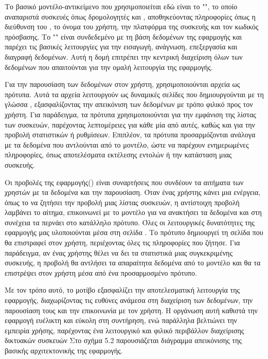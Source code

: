 Το βασικό μοντέλο-αντικείμενο που χρησιμοποιείται εδώ είναι το "", 
το οποίο αναπαριστά συσκευές όπως δρομολογητές και , 
αποθηκεύοντας πληροφορίες όπως η διεύθυνση του , το όνομα του
χρήστη, την πλατφόρμα της συσκευής και τον κωδικός πρόσβασης.
Το "" είναι συνδεδεμένο με 
τη βάση δεδομένων της εφαρμογής και παρέχει τις βασικές λειτουργίες 
για την εισαγωγή, ανάγνωση, επεξεργασία και διαγραφή δεδομένων. 
Αυτή η δομή επιτρέπει την κεντρική διαχείριση όλων των δεδομένων που 
απαιτούνται για την ομαλή λειτουργία της εφαρμογής.

Για την παρουσίαση των δεδομένων στον χρήστη, χρησιμοποιούνται αρχεία 
 ως πρότυπα. Αυτά τα αρχεία λειτουργούν ως δυναμικές σελίδες 
που δημιουργούνται με τη γλώσσα , εξασφαλίζοντας 
την απεικόνιση των δεδομένων με τρόπο φιλικό προς τον χρήστη. 
Για παράδειγμα, τα πρότυπα χρησιμοποιούνται για την εμφάνιση της λίστας των συσκευών, παρέχοντας λεπτομέρειες για κάθε μία από αυτές, καθώς και για την προβολή στατιστικών ή ρυθμίσεων. Επιπλέον, τα πρότυπα προσαρμόζονται ανάλογα με τα δεδομένα που αντλούνται από το μοντέλο, ώστε να παρέχουν ενημερωμένες πληροφορίες, όπως αποτελέσματα εκτέλεσης εντολών ή την κατάσταση μιας συσκευής.

Οι προβολές της εφαρμογής() είναι συναρτήσεις  που συνδέουν 
τα αιτήματα των χρηστών με τα δεδομένα και την παρουσίαση. 
Όταν ένας χρήστης κάνει μια ενέργεια, όπως το να ζητήσει την προβολή 
μιας λίστας συσκευών, η αντίστοιχη προβολή λαμβάνει το αίτημα, 
επικοινωνεί με το μοντέλο για να ανακτήσει τα δεδομένα και στη 
συνέχεια τα περνάει στο κατάλληλο πρότυπο. Όλες οι λειτουργικές δυνατότητες της εφαρμογής μας υλοποιούνται μέσα στη σελίδα .
Το πρότυπο δημιουργεί τη σελίδα  που θα επιστραφεί στον χρήστη, περιέχοντας όλες τις πληροφορίες που ζήτησε. Για παράδειγμα, αν ένας χρήστης θέλει να δει τα στατιστικά μιας συγκεκριμένης συσκευής, η προβολή θα αντλήσει τα απαραίτητα δεδομένα από το μοντέλο και θα τα επιστρέψει στον χρήστη μέσα από ένα προσαρμοσμένο πρότυπο.

Με τον τρόπο αυτό, το μοτίβο  εξασφαλίζει την αποτελεσματική 
λειτουργία της εφαρμογής, διαχωρίζοντας τις ευθύνες ανάμεσα στη 
διαχείριση των δεδομένων, την παρουσίαση τους και την επικοινωνία με τον χρήστη. Η οργάνωση αυτή καθιστά την εφαρμογή ευέλικτη και εύκολη στη συντήρηση, ενώ παράλληλα βελτιώνει την εμπειρία χρήσης, παρέχοντας ένα λειτουργικό και φιλικό περιβάλλον διαχείρισης δικτυακών συσκευών
Στο σχήμα 5.2 παρουσιάζεται διάγραμμα απεικόνισης της βασικής αρχιτεκτονικής της εφαρμογής.


